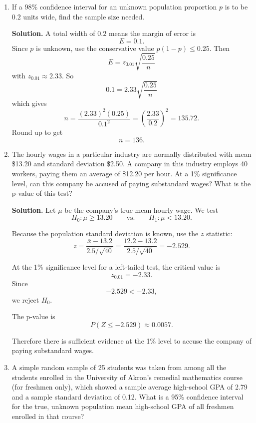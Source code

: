 \documentclass[12pt]{article}
\begin{document}
\begin{enumerate}[label=(\arabic*), leftmargin=*]
\par\medskip
\noindent\textbf{Solution.}
The point estimate is the sample proportion:
\[
\hat p=\frac{251}{400}=0.6275.
\]

Using $z_{0.01}\approx 2.33$, an approximate 98\% confidence interval is
\[
\hat p \pm 2.33\sqrt{\frac{\hat p(1-\hat p)}{400}}.
\]
So
\[
0.6275 \pm 2.33\sqrt{\frac{0.6275(0.3725)}{400}}
\approx 0.6275 \pm 0.0563.
\]
Hence the interval is
\[
\boxed{(0.5712,\ 0.6838)}.
\]

\item If a 98\% confidence interval for an unknown population proportion $p$ is to be $0.2$ units wide, find the sample size needed.

\par\medskip
\noindent\textbf{Solution.}
A total width of $0.2$ means the margin of error is
\[
E=0.1.
\]
Since $p$ is unknown, use the conservative value $p(1-p)\le 0.25$. Then
\[
E=z_{0.01}\sqrt{\frac{0.25}{n}}
\]
with $z_{0.01}\approx 2.33$. So
\[
0.1=2.33\sqrt{\frac{0.25}{n}}
\]
which gives
\[
n=\frac{(2.33)^2(0.25)}{0.1^2}
=\left(\frac{2.33}{0.2}\right)^2
=135.72.
\]
Round up to get
\[
\boxed{n=136}.
\]

\item The hourly wages in a particular industry are normally distributed with mean \$13.20 and standard deviation \$2.50. A company in this industry employs 40 workers, paying them an average of \$12.20 per hour. At a 1\% significance level, can this company be accused of paying substandard wages? What is the p-value of this test?

\par\medskip
\noindent\textbf{Solution.}
Let $\mu$ be the company's true mean hourly wage. We test
\[
H_0:\mu\ge 13.20
\qquad \text{vs.} \qquad
H_1:\mu<13.20.
\]

Because the population standard deviation is known, use the $z$ statistic:
\[
z=\frac{\overline{x}-13.2}{2.5/\sqrt{40}}
=\frac{12.2-13.2}{2.5/\sqrt{40}}
=-2.529.
\]

At the 1\% significance level for a left-tailed test, the critical value is
\[
z_{0.01}=-2.33.
\]
Since
\[
-2.529<-2.33,
\]
we reject $H_0$.

The p-value is
\[
P(Z\le -2.529)\approx 0.0057.
\]

Therefore there is sufficient evidence at the 1\% level to accuse the company of paying substandard wages.

\item A simple random sample of 25 students was taken from among all the students enrolled in the University of Akron's remedial mathematics course (for freshmen only), which showed a sample average high-school GPA of 2.79 and a sample standard deviation of 0.12. What is a 95\% confidence interval for the true, unknown population mean high-school GPA of all freshmen enrolled in that course?


\end{enumerate}
\end{document}
